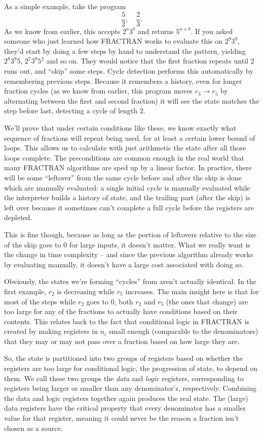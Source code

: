 \documentclass[12pt]{article}
\begin{document}
As a simple example, take the program
\[
\frac{5}{2},\quad \frac{2}{3}.
\]
As we know from earlier, this accepts $2^a 3^b$ and returns $5^{a+b}$. If you asked someone who just learned how FRACTRAN works to evaluate this on $2^9 3^9$, they'd start by doing a few steps by hand to understand the pattern, yielding $2^8 3^9 5$, $2^7 3^9 5^2$ and so on. They would notice that the first fraction repeats until 2 runs out, and ``skip'' some steps. Cycle detection performs this automatically by remembering previous steps. Because it remembers a history, even for longer fraction cycles (as we know from earlier, this program moves $r_3 \to r_5$ by alternating between the first and second fraction) it will see the state matches the step before last, detecting a cycle of length 2.

We'll prove that under certain conditions like these, we know exactly what sequence of fractions will repeat being used, for at least a certain lower bound of loops. This allows us to calculate with just arithmetic the state after all those loops complete. The preconditions are common enough in the real world that many FRACTRAN algorithms are sped up by a linear factor. In practice, there will be some ``leftover'' from the same cycle before and after the skip is done which are manually evaluated: a single initial cycle is manually evaluated while the interpreter builds a history of state, and the trailing part (after the skip) is left over because it sometimes can't complete a full cycle before the registers are depleted.

This is fine though, because as long as the portion of leftovers relative to the size of the skip goes to 0 for large inputs, it doesn't matter. What we really want is the change in time complexity -- and since the previous algorithm already works by evaluating manually, it doesn't have a large cost associated with doing so.

Obviously, the states we're forming ``cycles'' from aren't actually identical. In the first example, $r_2$ is decreasing while $r_5$ increases. The main insight here is that for most of the steps while $r_2$ goes to 0, both $r_2$ and $r_5$ (the ones that change) are too large for any of the fractions to actually have conditions based on their contents. This relates back to the fact that conditional logic in FRACTRAN is created by making registers in $n_i$ small enough (comparable to the denominators) that they may or may not pass over a fraction based on how large they are.

So, the state is partitioned into two groups of registers based on whether the registers are too large for conditional logic, the progression of state, to depend on them. We call these two groups the \emph{data} and \emph{logic} registers, corresponding to registers being larger or smaller than any denominator's, respectively. Combining the data and logic registers together again produces the real state. The (large) data registers have the critical property that every denominator has a smaller value for that register, meaning it could never be the reason a fraction isn't chosen as a source.
\end{document}
